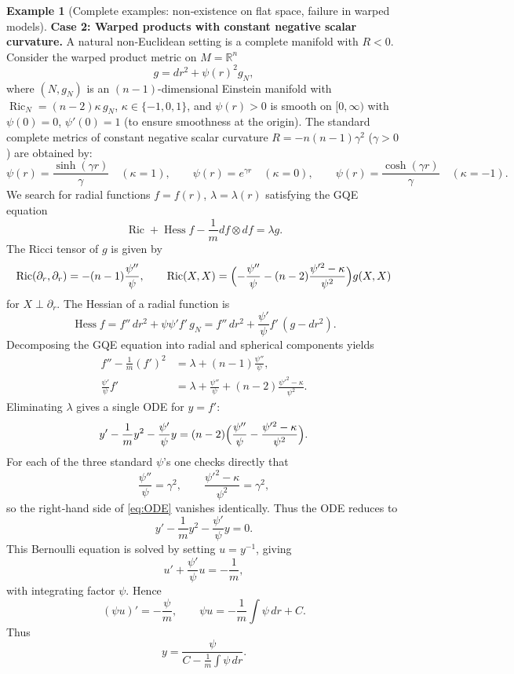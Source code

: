 \documentclass[12pt,a4paper]{article}
\newcommand{\Ric}{\operatorname{Ric}}
\newcommand{\Hess}{\operatorname{Hess}}
\theoremstyle{definition}
\newtheorem{example}[theorem]{Example}
\theoremstyle{definition}
\begin{document}
\begin{example}[Complete examples: non‑existence on flat space, failure in warped models]
\medskip
\noindent\textbf{Case 2: Warped products with constant negative scalar curvature.}
A natural non‑Euclidean setting is a complete manifold with $R<0$.
Consider the warped product metric on $M=\mathbb{R}^{n}$
\[
g = dr^{2} + \psi(r)^{2} g_{N},
\]
where $(N,g_{N})$ is an $(n-1)$-dimensional Einstein manifold with $\Ric_{N} = (n-2)\kappa\,g_{N}$, $\kappa\in\{-1,0,1\}$, and $\psi(r)>0$ is smooth on $[0,\infty)$ with $\psi(0)=0$, $\psi'(0)=1$ (to ensure smoothness at the origin).
The standard complete metrics of constant negative scalar curvature $R = -n(n-1)\gamma^{2}$ ($\gamma>0$) are obtained by:
\[
\psi(r) = \frac{\sinh(\gamma r)}{\gamma}\quad (\kappa=1),\qquad
\psi(r) = e^{\gamma r}\quad (\kappa=0),\qquad
\psi(r) = \frac{\cosh(\gamma r)}{\gamma}\quad (\kappa=-1).
\]
We search for radial functions $f = f(r)$, $\lambda = \lambda(r)$ satisfying the GQE equation
\[
\Ric + \Hess f - \frac1m df\otimes df = \lambda g.
\]
The Ricci tensor of $g$ is given by
\[
\Ric(\partial_{r},\partial_{r}) = -(n-1)\frac{\psi''}{\psi},\qquad
\Ric(X,X) = \Bigl( -\frac{\psi''}{\psi} - (n-2)\frac{\psi'^{2} - \kappa}{\psi^{2}} \Bigr) g(X,X)
\]
for $X\perp\partial_{r}$.
The Hessian of a radial function is
\[
\Hess f = f''\,dr^{2} + \psi\psi' f' \,g_{N} = f''\,dr^{2} + \frac{\psi'}{\psi} f'\, (g - dr^{2}).
\]
Decomposing the GQE equation into radial and spherical components yields
\begin{align}
f'' - \frac1m (f')^{2} &= \lambda + (n-1)\frac{\psi''}{\psi}, \label{eq:radial2}\\
\frac{\psi'}{\psi} f' &= \lambda + \frac{\psi''}{\psi} + (n-2)\frac{\psi'^{2} - \kappa}{\psi^{2}}. \label{eq:spherical2}
\end{align}
Eliminating $\lambda$ gives a single ODE for $y = f'$:
\begin{equation}
y' - \frac1m y^{2} - \frac{\psi'}{\psi} y = (n-2)\Bigl( \frac{\psi''}{\psi} - \frac{\psi'^{2} - \kappa}{\psi^{2}} \Bigr). \label{eq:ODE}
\end{equation}
For each of the three standard $\psi$'s one checks directly that
\[
\frac{\psi''}{\psi} = \gamma^{2},\qquad \frac{\psi'^{2} - \kappa}{\psi^{2}} = \gamma^{2},
\]
so the right‑hand side of \eqref{eq:ODE} vanishes identically. Thus the ODE reduces to
\[
y' - \frac1m y^{2} - \frac{\psi'}{\psi} y = 0.
\]
This Bernoulli equation is solved by setting $u = y^{-1}$, giving
\[
u' + \frac{\psi'}{\psi} u = -\frac1m,
\]
with integrating factor $\psi$. Hence
\[
(\psi u)' = -\frac{\psi}{m},\qquad
\psi u = -\frac1m \int \psi\,dr + C.
\]
Thus
\[
y = \frac{\psi}{C - \frac1m \int \psi\,dr}.
\]


\end{example}
\end{document}
